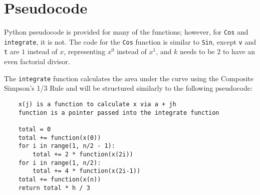 \documentclass[12pt]{article}
\begin{document}
\section{Pseudocode}

Python pseudocode is provided for many of the functions; however, for \verb|Cos| and \verb|integrate|, it is not. The code for the \verb|Cos| function is similar to \verb|Sin|, except \verb|v| and \verb|t| are $1$ instead of $x$, representing $x^0$ instead of $x^1$, and $k$ needs to be $2$ to have an even factorial divisor.

The \verb|integrate| function calculates the area under the curve using the Composite Simpson's 1/3 Rule and will be structured similarly to the following pseudocode:
\begin{verbatim}
    x(j) is a function to calculate x via a + jh
    function is a pointer passed into the integrate function
    
    total = 0
    total += function(x(0))
    for i in range(1, n/2 - 1):
        total += 2 * function(x(2i))
    for i in range(1, n/2):
        total += 4 * function(x(2i-1))
    total += function(x(n))
    return total * h / 3
\end{verbatim}
\end{document}
